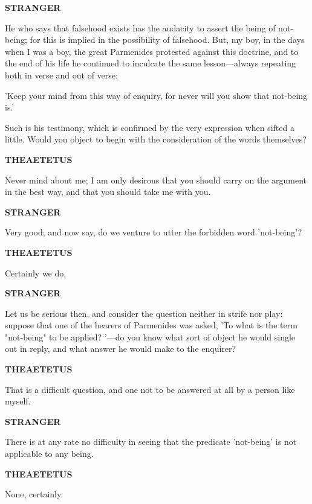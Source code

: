 \documentclass[11pt,letter]{article}
\begin{document}
\par \textbf{STRANGER}
\par   He who says that falsehood exists has the audacity to assert the being of not-being; for this is implied in the possibility of falsehood. But, my boy, in the days when I was a boy, the great Parmenides protested against this doctrine, and to the end of his life he continued to inculcate the same lesson—always repeating both in verse and out of verse:

\par  'Keep your mind from this way of enquiry, for never will you show that not-being is.'

\par  Such is his testimony, which is confirmed by the very expression when sifted a little. Would you object to begin with the consideration of the words themselves?

\par \textbf{THEAETETUS}
\par   Never mind about me; I am only desirous that you should carry on the argument in the best way, and that you should take me with you.

\par \textbf{STRANGER}
\par   Very good; and now say, do we venture to utter the forbidden word 'not-being'?

\par \textbf{THEAETETUS}
\par   Certainly we do.

\par \textbf{STRANGER}
\par   Let us be serious then, and consider the question neither in strife nor play:  suppose that one of the hearers of Parmenides was asked, 'To what is the term "not-being" to be applied? '—do you know what sort of object he would single out in reply, and what answer he would make to the enquirer?

\par \textbf{THEAETETUS}
\par   That is a difficult question, and one not to be answered at all by a person like myself.

\par \textbf{STRANGER}
\par   There is at any rate no difficulty in seeing that the predicate 'not-being' is not applicable to any being.

\par \textbf{THEAETETUS}
\par   None, certainly.
\end{document}
